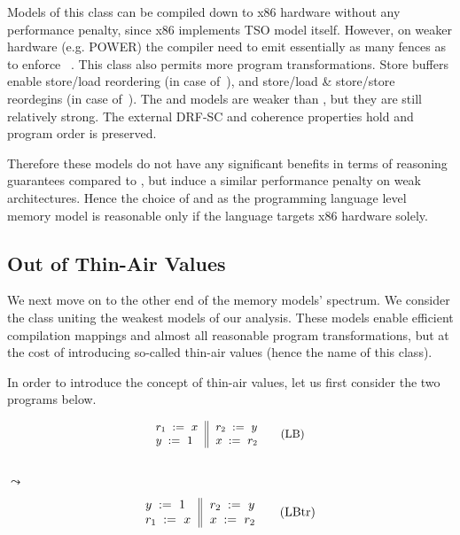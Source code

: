 Models of this class can be compiled down to x86 hardware without any 
performance penalty, since x86 implements TSO model itself.
However, on weaker hardware (e.g. POWER) 
the compiler need to emit essentially as many fences 
as to enforce \SC~\cite{Lustig-al:AISCA15}. 
This class also permits more program transformations.
Store buffers enable store/load reordering (in case of~\TSO),
and store/load \& store/store reordegins (in case of~\PSO).
The \TSO and \PSO models are weaker than \SC, 
but they are still relatively strong.
The external DRF-SC and coherence properties hold
and program order is preserved.

Therefore these models do not have any significant 
benefits in terms of reasoning guarantees compared to \SC,
but induce a similar performance penalty on weak architectures. 
Hence the choice of \TSO and \PSO as the programming language level
memory model is reasonable only if the language targets x86 hardware solely. 

\subsection{Out of Thin-Air Values}
\label{sec:analysis:oota}

We next move on to the other end of the memory models' spectrum. 
We consider the class uniting the weakest models of our analysis.
These models enable efficient compilation mappings and 
almost all reasonable program transformations, but at the cost of 
introducing so-called thin-air values (hence the name of this class).

In order to introduce the concept of thin-air values, 
let us first consider the two programs below. 

\begin{minipage}{0.43\linewidth}
\begin{equation*}
\small
\inarrII{
  \readInst{}{r_1}{x}     \\
  \writeInst{}{y}{1}      \\
}{
  \readInst{}{r_2}{y}     \\
  \writeInst{}{x}{r_2}    \\
}
\tag{LB}\label{ex:lb}
\end{equation*}
\end{minipage}\hfill%
\begin{minipage}{0.09\linewidth}
\Large~\\ $\leadsto$
\end{minipage}\hfill%
\begin{minipage}{0.43\linewidth}
\begin{equation*}
\inarrII{
  \writeInst{}{y}{1}      \\
  \readInst{}{r_1}{x}     \\
}{
  \readInst{}{r_2}{y}     \\
  \writeInst{}{x}{r_2}    \\
}
\tag{LBtr}\label{ex:lbtr}
\end{equation*}
\end{minipage}

